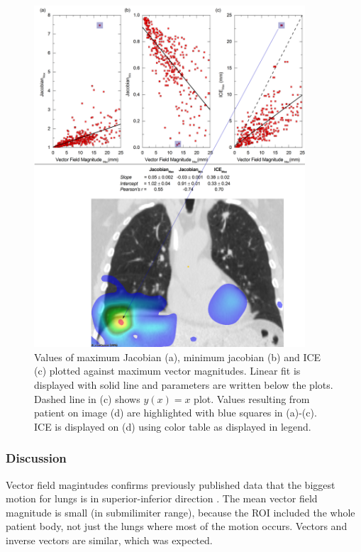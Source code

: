 \documentclass[type=dr, dr=rernat, accentcolor=tud7b,colorbacktitle, bigchapter, openright, twoside, 12pt ]{tudthesis}
\begin{document}
\begin{figure}[H]
	\begin{center}		
		\includegraphics[width=0.9\textwidth]{./Images/maxVf_lung.png}
		\caption{Values of maximum Jacobian (a), minimum jacobian (b) and ICE (c) plotted against maximum vector magnitudes. Linear fit is displayed with solid line and parameters are written below the plots. Dashed line in (c) shows $y(x)= x$ plot. Values resulting from patient on image (d) are highlighted with blue squares in (a)-(c).
			ICE is displayed on (d) using color table as displayed in legend.}
		\label{maxvf}
	\end{center}
\end{figure}

\newpage

\subsubsection{Discussion}

Vector field magintudes confirms previously published data that the biggest motion for lungs is in superior-inferior direction \cite{Seppenwoolde2002, Britton2007, Liu2007}. The mean vector field magnitude is small (in submilimiter range), 
because the ROI included the whole patient body, not just the lungs where most of the motion occurs. Vectors and inverse vectors are similar, which was expected.
\end{document}
